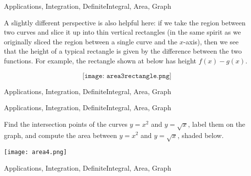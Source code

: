 \begin{tagblock}{Applications, Integration, DefiniteIntegral, Area, Graph}
\begin{question}
A slightly different perspective is also helpful here: if we take the region between two curves and slice it up into thin vertical rectangles (in the same spirit as we originally sliced the region between a single curve and the $x$-axis), then we see that the height of a typical rectangle is given by the difference between the two functions. For example, the rectangle shown at below has height $f(x) - g(x)$.  


\[\texttt{[image: area3rectangle.png]} \]

    
\begin{tags}
       Applications, Integration, DefiniteIntegral, Area, Graph
\end{tags}
    
\begin{diary}
\end{diary}
	
\begin{solution}

\end{solution}
	
\end{question}

\end{tagblock}

\begin{tagblock}{Applications, Integration, DefiniteIntegral, Area, Graph}
\begin{question}
	


Find the intersection points of the curves  $y=x^2$ and $y= \sqrt{x}$, label them on the graph, and compute the area between $y=x^2$ and $y= \sqrt{x}$, shaded below.  

\texttt{[image: area4.png]} 

    
\begin{tags}
       Applications, Integration, DefiniteIntegral, Area, Graph
\end{tags}
    
\begin{diary}
\end{diary}
	
\begin{solution}

\end{solution}
	
\end{question}

\end{tagblock}

